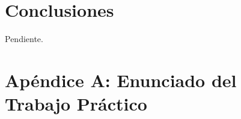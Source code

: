\documentclass[a4paper,10pt,twoside]{article}
\begin{document}









\section{Conclusiones}

Pendiente.



\newpage

\section{Apéndice A: Enunciado del Trabajo Práctico}


\end{document}

